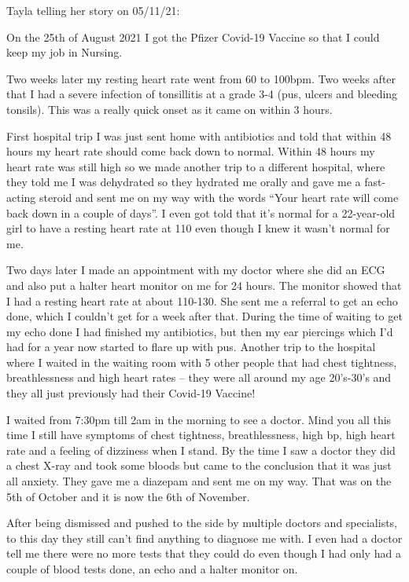 Tayla telling her story on 05/11/21:

On the 25th of August 2021 I got the Pfizer Covid-19 Vaccine so that I could
keep my job in Nursing.

Two weeks later my resting heart rate went from 60 to 100bpm. Two weeks after
that I had a severe infection of tonsillitis at a grade 3-4 (pus, ulcers and
bleeding tonsils). This was a really quick onset as it came on within 3 hours.

First hospital trip I was just sent home with antibiotics and told that within
48 hours my heart rate should come back down to normal. Within 48 hours my heart
rate was still high so we made another trip to a different hospital, where they
told me I was dehydrated so they hydrated me orally and gave me a fast-acting
steroid and sent me on my way with the words “Your heart rate will come back
down in a couple of days”. I even got told that it’s normal for a 22-year-old
girl to have a resting heart rate at 110 even though I knew it wasn’t normal for
me.

Two days later I made an appointment with my doctor where she did an ECG and
also put a halter heart monitor on me for 24 hours. The monitor showed that I
had a resting heart rate at about 110-130. She sent me a referral to get an echo
done, which I couldn’t get for a week after that. During the time of waiting to
get my echo done I had finished my antibiotics, but then my ear piercings which
I’d had for a year now started to flare up with pus. Another trip to the
hospital where I waited in the waiting room with 5 other people that had chest
tightness, breathlessness and high heart rates – they were all around my age
20’s-30’s and they all just previously had their Covid-19 Vaccine!

I waited from 7:30pm till 2am in the morning to see a doctor. Mind you all this
time I still have symptoms of chest tightness, breathlessness, high bp, high
heart rate and a feeling of dizziness when I stand. By the time I saw a doctor
they did a chest X-ray and took some bloods but came to the conclusion that it
was just all anxiety. They gave me a diazepam and sent me on my way. That was on
the 5th of October and it is now the 6th of November.

After being dismissed and pushed to the side by multiple doctors and
specialists, to this day they still can’t find anything to diagnose me with. I
even had a doctor tell me there were no more tests that they could do even
though I had only had a couple of blood tests done, an echo and a halter monitor
on.

